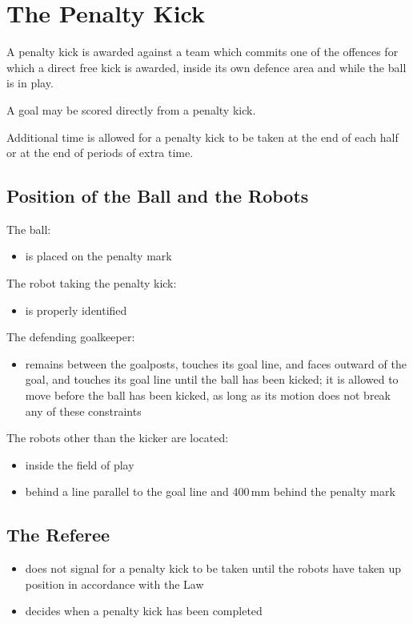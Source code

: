 \section{The Penalty Kick}\label{sec:penalty-kick}

A penalty kick is awarded against a team which commits one of the offences for which a direct free kick is awarded, inside its own defence area and while the ball is in play.

A goal may be scored directly from a penalty kick.

Additional time is allowed for a penalty kick to be taken at the end of each half or at the end of periods of extra time.

\subsection{Position of the Ball and the Robots}
The ball:

\begin{itemize}
\item is placed on the penalty mark
\end{itemize}

The robot taking the penalty kick:

\begin{itemize}
\item is properly identified
\end{itemize}

The defending goalkeeper:

\begin{itemize}
\item remains between the goalposts, touches its goal line, and faces outward of the goal, and touches its goal line until the ball has been kicked; it is allowed to move before the ball has been kicked, as long as its motion does not break any of these constraints
\end{itemize}

The robots other than the kicker are located:

\begin{itemize}
\item inside the field of play
\item behind a line parallel to the goal line and 400\,mm behind the penalty mark
\end{itemize}

\subsection{The Referee}
\begin{itemize}
\item does not signal for a penalty kick to be taken until the robots have taken up position in accordance with the Law
\item decides when a penalty kick has been completed
\end{itemize}

